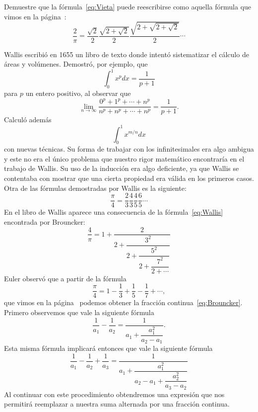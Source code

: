 \begin{exercise}
	Demuestre que la fórmula~\eqref{eq:Vieta} puede reescribirse como aquella
	fórmula que vimos en la página~\pageref{Vieta}:
	\[
		\frac{2}{\pi}
		=\dfrac{\sqrt{2}}{2}\dfrac{\sqrt{2+\sqrt{2}}}{2}\dfrac{\sqrt{2+\sqrt{2+\sqrt{2}}}}{2}\cdots
	\]
\end{exercise}

Wallis escribió en 1655 un libro de texto donde intentó sistematizar el cálculo
de áreas y volúmenes. Demostró, por ejemplo, que 
\[
	\int_0^1 x^pdx=\frac{1}{p+1}
\]
para $p$ un entero positivo, al observar 
que 
\[
	\lim_{n\to\infty}\frac{0^p+1^p+\cdots+n^p}{n^p+n^p+\cdots+n^p}=\frac{1}{p+1}.
\]
Calculó además
\[
	\int_0^1 x^{m/n}dx
\]
con nuevas técnicas. Su forma de trabajar con los infinitesimales era algo
ambigua y este no era el único problema que nuestro rigor matemático
encontraría en el trabajo de Wallis. Su uso de la inducción era algo
deficiente, ya que Wallis se contentaba con mostrar que una cierta propiedad
era válida en los primeros casos. Otra de las fórmulas demostradas por Wallis
es la siguiente:
\begin{equation}
	\label{eq:Wallis}
	\frac{\pi}{4}=\frac23\frac43\frac45\frac65\cdots
\end{equation}
En el libro de Wallis aparece una consecuencia de la fórmula~\eqref{eq:Wallis}
encontrada por Brouncker:
\begin{equation}
	\label{eq:Brouncker}
	\frac{4}{\pi}=1+\dfrac{2}{2+\dfrac{3^2}{2+\dfrac{5^2}{2+\dfrac{7^2}{2+\cdots}}}}
\end{equation}
Euler observó que a partir de la fórmula 
\begin{equation}
	\label{eq:Leibniz}
	\frac{\pi}{4}=1-\frac13+\frac15-\frac17+\cdots,
\end{equation}
que vimos en la página~\pageref{LeibnizGregory} podemos obtener 
la fracción continua~\eqref{eq:Brouncker}. Primero observemos que vale la siguiente fórmula
\[
	\dfrac{1}{a_1}-\dfrac{1}{a_2}=\dfrac{1}{a_1+\dfrac{a_1^2}{a_2-a_1}}.
\]
Esta misma fórmula implicará entonces que vale la siguiente fórmula 
\[
	\dfrac{1}{a_1}-\dfrac{1}{a_2}+\dfrac{1}{a_3}=\dfrac{1}{a_1+\dfrac{a_1^2}{a_2-a_1+\dfrac{a_2^2}{a_3-a_2}}}
\]
Al continuar con este procedimiento obtendremos una expresión que nos permitirá
reemplazar a nuestra suma alternada por una fracción continua. 

